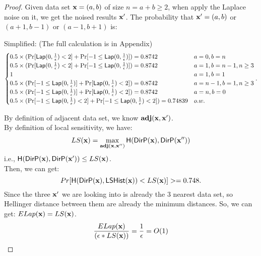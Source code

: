 \documentclass{article}
\begin{document}
{\begin{proof}
Given data set $\textbf{x} = (a,b)$ of size $ n = a + b \geq 2$, when apply the Laplace noise on it, we get the noised results $\textbf{x}'$. The probability that $\textbf{x}' = (a,b)$ or $(a + 1, b-1)$ or $(a - 1, b + 1)$ is:


Simplified: (The full calculation is in Appendix)
{\footnotesize
\begin{equation}
\label{eq:proofbound1}
\begin{cases}
 	0.5 \times 
 	(\Pr[	\lap{0}{\frac{1}{\epsilon}}	<	2] 
 	+ 	
 	\Pr[	-1	\leq \lap{0}{\frac{1}{\epsilon}}])
	= 0.8742
	& a = 0,	b = n\\
%
 	0.5 \times 
 	(\Pr[	\lap{0}{\frac{1}{\epsilon}}	<	2] 
 	+ 	
 	\Pr[	-1	\leq \lap{0}{\frac{1}{\epsilon}}])
 	= 0.8742
	& a = 1,	b = n - 1, n \geq 3\\
%
	1
	& a = 1, b = 1\\
%
 	0.5 \times 
 	(\Pr[	-1	\leq \lap{0}{\frac{1}{\epsilon}}] 
 	+ 	
 	\Pr[	\lap{0}{\frac{1}{\epsilon}}		<	2])
	= 0.8742
	& a = n - 1,	b = 1, n \geq 3\\
%
 	0.5 \times 
 	(\Pr[	-1	\leq \lap{0}{\frac{1}{\epsilon}}] 
 	+ 	
 	\Pr[	\lap{0}{\frac{1}{\epsilon}}		<	2])
	= 0.8742
%
	& a = n,b = 0\\
 	0.5 \times 
 	(\Pr[	-1	\leq \lap{0}{\frac{1}{\epsilon}}	<	2] 
 	+ 	
 	\Pr[	-1	\leq \lap{0}{\frac{1}{\epsilon}}	<	2])
	= 0.74839
	& o.w.
%
\end{cases}.
\end{equation}
}

By definition of adjacent data set, we know $\textbf{adj}(\textbf{x},\textbf{x}')$.\\
By definition of local sensitivity, we have:
\[
LS(\textbf{x}) = \max\limits_{\textbf{adj}(\textbf{x},\textbf{x}'')}\mathsf{H}(\mathsf{DirP}(\textbf{x}),\mathsf{DirP}(\textbf{x}''))
\]
i.e., $\mathsf{H}(\mathsf{DirP}(\textbf{x}),\mathsf{DirP}(\textbf{x}')) \leq LS(\textbf{x})$.\\
Then, we can get:
\[
Pr[\mathsf{H}(\mathsf{DirP}(\textbf{x}), \mathsf{LSHist}(\textbf{x})) < LS(\textbf{x})] >= 0.748.
\]
Since the three $\textbf{x}'$ we are looking into is already the 3 nearest data set, so Hellinger distance between them are already the minimum distances. So, we can get: $ELap(\textbf{x}) = LS(\textbf{x})$.\\
\[
\frac{ELap(\textbf{x})}{(\epsilon*LS(\textbf{x}))} = \frac{1}{\epsilon} = O(1)
\]



\end{proof}}
\end{document}

